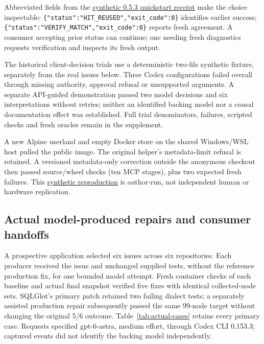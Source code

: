 \documentclass[preprint,12pt,a4paper]{elsarticle}
\newcommand{\code}[1]{\texttt{#1}}
\begin{document}
Abbreviated fields from the \href{https://github.com/floxy-21/zerorun-research/blob/6a2aab778a290102dbe4c8652eefb3310d15d1e0/research/softwarex/evidence/quickstart-public-053-v1/check.json}{synthetic 0.5.3 quickstart receipt} make the choice inspectable: \code{\{"status":"HIT\_REUSED","exit\_code":0\}} identifies earlier success; \code{\{"status":"VERIFY\_MATCH","exit\_code":0\}} reports fresh agreement. A consumer accepting prior status can continue; one needing fresh diagnostics requests verification and inspects its fresh output.

The historical client-decision trials use a deterministic two-file synthetic fixture, separately from the real issues below. Three Codex configurations failed overall through missing authority, approval refusal or unsupported arguments. A separate API-guided demonstration passed two model decisions and six interpretations without retries; neither an identified backing model nor a causal documentation effect was established. Full trial denominators, failures, scripted checks and fresh oracles remain in the supplement.

A new Alpine userland and empty Docker store on the shared Windows/WSL host pulled the public image. The original helper's metadata-limit refusal is retained. A versioned metadata-only correction outside the anonymous checkout then passed source/wheel checks (ten MCP stages), plus two expected fresh failures. This \href{https://github.com/floxy-21/zerorun-research/blob/6a2aab778a290102dbe4c8652eefb3310d15d1e0/research/softwarex/FRESH_LINUX_053_REPRODUCTION.md}{synthetic reproduction} is author-run, not independent human or hardware replication.

\subsection{Actual model-produced repairs and consumer handoffs}
A prospective application selected six issues across six repositories. Each producer received the issue and unchanged supplied tests, without the reference production fix, for one bounded model attempt. Fresh container checks of each baseline and actual final snapshot verified five fixes with identical collected-node sets. SQLGlot's primary patch retained two failing dialect tests; a separately assisted production repair subsequently passed the same 99-node target without changing the original 5/6 outcome. Table~\ref{tab:actual-cases} retains every primary case. Requests specified gpt-6-astra, medium effort, through Codex CLI 0.153.3; captured events did not identify the backing model independently.
\end{document}
